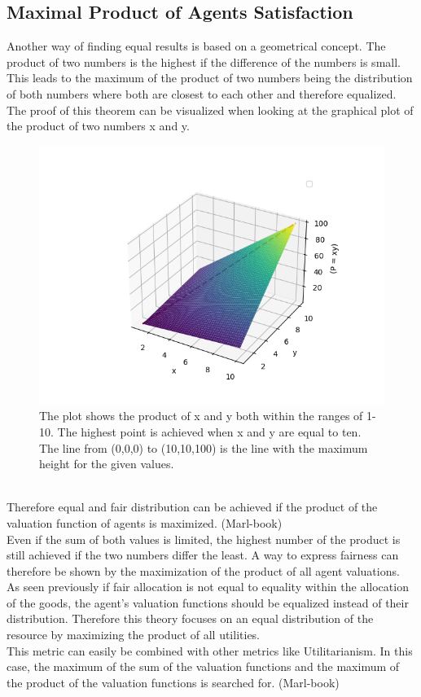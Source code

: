 \documentclass[german, a4paper, 11pt, oneside]{scrbook}
\begin{document}
 \subsection{Maximal Product of Agents Satisfaction}
Another way of finding equal results is based on a geometrical concept. The product of two numbers is the highest if the difference of the numbers is small. This leads to the maximum of the product of two numbers being the distribution of both numbers where both are closest to each other and therefore equalized. \\The proof of this theorem can be visualized when looking at the graphical plot of the product of two numbers x and y. 
\begin{figure}[h]
\centering
\includegraphics[width=1.0\textwidth]{x_times_y}
\caption{The plot shows the product of x and y both within the ranges of 1-10. The highest point is achieved when x and y are equal to ten. The line from (0,0,0) to (10,10,100) is the line with the maximum height for the given values.}
\end{figure}
\\Therefore equal and fair distribution can be achieved if the product of the valuation function of agents is maximized. (Marl-book)
\\Even if the sum of both values is limited, the highest number of the product is still achieved if the two numbers differ the least. A way to express fairness can therefore be shown by the maximization of the product of all agent valuations. \\As seen previously if fair allocation is not equal to equality within the allocation of the goods, the agent's valuation functions should be equalized instead of their distribution. Therefore this theory focuses on an equal distribution of the resource by maximizing the product of all utilities. \\This metric can easily be combined with other metrics like Utilitarianism. In this case, the maximum of the sum of the valuation functions and the maximum of the product of the valuation functions is searched for. (Marl-book)
\end{document}
